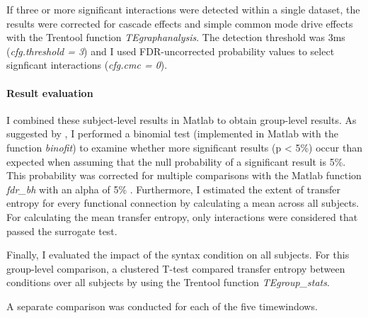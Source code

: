 If three or more significant interactions were detected within a single dataset, the results were corrected for cascade effects and simple common mode drive effects with the Trentool function \emph{TEgraphanalysis}.
The detection threshold was 3ms (\emph{cfg.threshold = 3}) and I used FDR-uncorrected probability values to select signficant interactions (\emph{cfg.cmc = 0}).

\paragraph{Result evaluation}

I combined these subject-level results in Matlab to obtain group-level results.
As suggested by \cite{3.4.binomialtest}, I performed a binomial test (implemented in Matlab with the function \emph{binofit}) to examine whether more significant results (p < 5\%) occur than expected when assuming that the null probability of a significant result is 5\%.
This probability was corrected for multiple comparisons \cite{3.4.FDR.a} with the Matlab function \emph{fdr\_bh} with an alpha of 5\% \cite{3.4.FDR.implementation}.
Furthermore, I estimated the extent of transfer entropy for every functional connection by calculating a  mean across all subjects.
For calculating the mean transfer entropy, only interactions were considered that passed the surrogate test.

Finally, I evaluated the impact of the syntax condition on all subjects.
For this group-level comparison, a clustered T-test compared transfer entropy between conditions over all subjects by using the Trentool function \emph{TEgroup\_stats}.

A separate comparison was conducted for each of the five timewindows.
